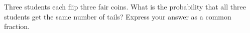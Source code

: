 Three students each flip three fair coins. What is the probability that all three students get the same number of tails? Express your answer as a common fraction.
